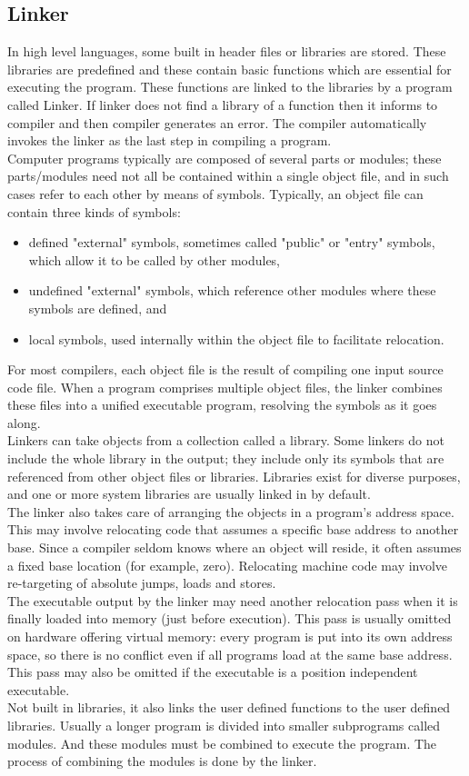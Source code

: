 \documentclass[12pt]{article}
\begin{document}
\subsection{Linker}
In high level languages, some built in header files or libraries are stored. These libraries are predefined and these contain basic functions which are essential for executing the program. These functions are linked to the libraries by a program called Linker. If linker does not find a library of a function then it informs to compiler and then compiler generates an error. The compiler automatically invokes the linker as the last step in compiling a program.\\Computer programs typically are composed of several parts or modules; these parts/modules need not all be contained within a single object file, and in such cases refer to each other by means of symbols. Typically, an object file can contain three kinds of symbols:
\begin{itemize}
  \item defined "external" symbols, sometimes called "public" or "entry" symbols, which allow it to be called by other modules, 
  \item undefined "external" symbols, which reference other modules where these symbols are defined, and \item local symbols, used internally within the object file to facilitate relocation.
\end{itemize}
For most compilers, each object file is the result of compiling one input source code file. When a program comprises multiple object files, the linker combines these files into a unified executable program, resolving the symbols as it goes along.\\Linkers can take objects from a collection called a library. Some linkers do not include the whole library in the output; they include only its symbols that are referenced from other object files or libraries. Libraries exist for diverse purposes, and one or more system libraries are usually linked in by default.\\The linker also takes care of arranging the objects in a program's address space. This may involve relocating code that assumes a specific base address to another base. Since a compiler seldom knows where an object will reside, it often assumes a fixed base location (for example, zero). Relocating machine code may involve re-targeting of absolute jumps, loads and stores.\\The executable output by the linker may need another relocation pass when it is finally loaded into memory (just before execution). This pass is usually omitted on hardware offering virtual memory: every program is put into its own address space, so there is no conflict even if all programs load at the same base address. This pass may also be omitted if the executable is a position independent executable.\\ 
Not built in libraries, it also links the user defined functions to the user defined libraries. Usually a longer program is divided into smaller subprograms called modules. And these modules must be combined to execute the program. The process of combining the modules is done by the linker.\\
\end{document}
